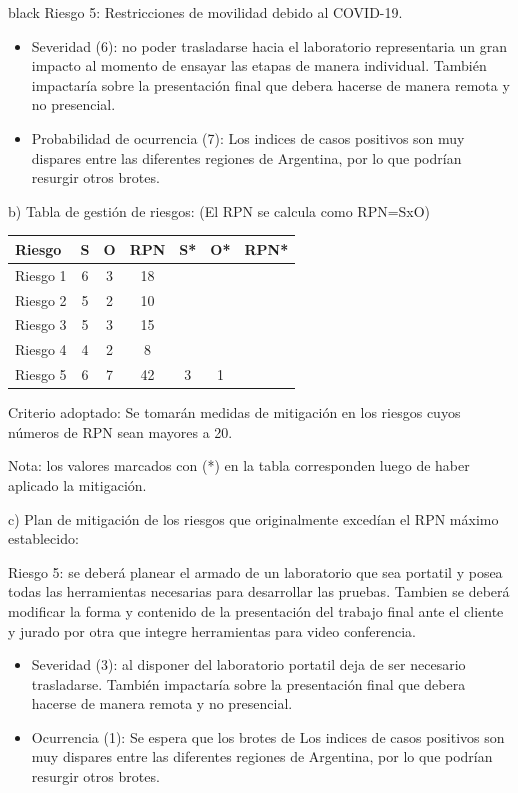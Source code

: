 \documentclass[11pt]{charter}
\begin{document}
\begin{consigna}{black}
Riesgo 5: Restricciones de movilidad debido al COVID-19.
\begin{itemize}
	\item Severidad (6): no poder trasladarse hacia el laboratorio representaria un gran impacto al momento de ensayar las etapas de manera individual. También impactaría sobre la presentación final que debera hacerse de manera remota y no presencial.
	\item Probabilidad de ocurrencia (7): Los indices de casos positivos son muy dispares entre las diferentes regiones de Argentina, por lo que podrían resurgir otros brotes.
\end{itemize}

b) Tabla de gestión de riesgos:      (El RPN se calcula como RPN=SxO)

\begin{table}[htpb]
\centering
\begin{tabularx}{\linewidth}{@{}|X|c|c|c|c|c|c|@{}}
\hline
\rowcolor[HTML]{C0C0C0} 
Riesgo & S & O & RPN & S* & O* & RPN* \\ \hline
 Riesgo 1& 6 & 3 & 18  &    &    &      \\ \hline
 Riesgo 2& 5 & 2 & 10  &    &    &      \\ \hline
 Riesgo 3& 5 & 3 & 15  &    &    &      \\ \hline
 Riesgo 4& 4 & 2 & 8   &    &    &      \\ \hline
 Riesgo 5& 6 & 7 & 42  &  3  &  1  &      \\ \hline
\end{tabularx}%
\end{table}

Criterio adoptado: 
Se tomarán medidas de mitigación en los riesgos cuyos números de RPN sean mayores a 20.

Nota: los valores marcados con (*) en la tabla corresponden luego de haber aplicado la mitigación.

c) Plan de mitigación de los riesgos que originalmente excedían el RPN máximo establecido:
 
Riesgo 5: se deberá planear el armado de un laboratorio que sea portatil y posea todas las herramientas necesarias para desarrollar las pruebas. Tambien se deberá modificar la forma y contenido de la presentación del trabajo final ante el cliente y jurado por otra que integre herramientas para video conferencia.
\begin{itemize}
	\item Severidad (3): al disponer del laboratorio portatil deja de ser necesario trasladarse. También impactaría sobre la presentación final que debera hacerse de manera remota y no presencial.
	\item Ocurrencia (1): Se espera que los brotes de Los indices de casos positivos son muy dispares entre las diferentes regiones de Argentina, por lo que podrían resurgir otros brotes.
\end{itemize}

\end{consigna}
\end{document}
